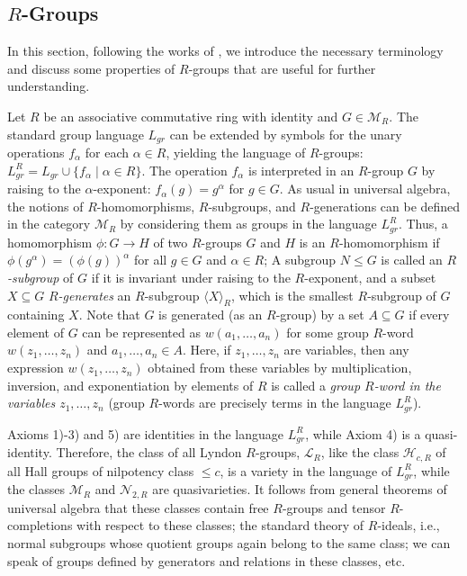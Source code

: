 \documentclass[11pt]{article}
\def\N{{\mathbb N}}
\def\M{{\mathcal{M}}}
\def\N{{\mathcal{N}}}
\theoremstyle{definition}
\begin{document}
\subsection{\texorpdfstring{$R$}{}-Groups}

In this section, following the works of \cite{1,2,AMN}, we introduce the necessary terminology and discuss some properties of $R$-groups that are useful for further understanding.

Let $R$ be an associative commutative ring with identity and $G \in \M_R$. The standard group language $L_{gr}$ can be extended by symbols for the unary operations $f_\alpha$ for each $\alpha \in R$, yielding the language of $R$-groups: $L_{gr}^R = L_{gr} \cup \{f_\alpha \mid \alpha \in R\}$. The operation $f_\alpha$ is interpreted in an $R$-group $G$ by raising to the $\alpha$-exponent: $f_\alpha(g) = g^\alpha$ for $g \in G$. As usual in universal algebra, the notions of $R$-homomorphisms, $R$-subgroups, and $R$-generations can be defined in the category $\M_R$ by considering them as groups in the language $L_{gr}^R$. Thus, a homomorphism $\phi:G\rightarrow H$ of two $R$-groups $G$ and $H$ is an $R$-homomorphism if $\phi(g^\alpha)=(\phi(g))^\alpha$ for all $g\in G$ and $\alpha\in R$; A subgroup $N \leq G$ is called an \emph{$R$-subgroup} of $G$ if it is invariant under raising to the $R$-exponent, and a subset $X \subseteq G$ \emph{$R$-generates} an $R$-subgroup $\langle X\rangle_R$, which is the smallest $R$-subgroup of $G$ containing $X$.
Note that $G$ is generated (as an $R$-group) by a set $A \subseteq G$ if every element of $G$ can be represented as $w(a_1, \ldots,a_n)$ for some group $R$-word $w(z_1, \ldots,z_n)$ and $a_1, \ldots, a_n \in A$. Here, if $z_1, \ldots, z_n$ are variables, then any expression $w(z_1, \ldots,z_n)$ obtained from these variables by multiplication, inversion, and exponentiation by elements of $R$ is called a \emph{group $R$-word in the variables $z_1, \ldots,z_n$} (group $R$-words are precisely terms in the language $L_{gr}^R$).

Axioms 1)-3) and 5) are identities in the language $L_{gr}^R$, while Axiom 4) is a quasi-identity. Therefore, the class of all Lyndon $R$-groups, $\mathcal{L}_R$, like the class $\mathcal{H}_{c,R}$ of all Hall groups of nilpotency class $\leq c$, is a variety in the language of $L_{gr}^R$, while the classes $\M_R$ and $\N_{2,R}$ are quasivarieties. It follows from general theorems of universal algebra that these classes contain free $R$-groups and tensor $R$-completions with respect to these classes; the standard theory of $R$-ideals, i.e., normal subgroups whose quotient groups again belong to the same class; we can speak of groups defined by generators and relations in these classes, etc.
\end{document}
